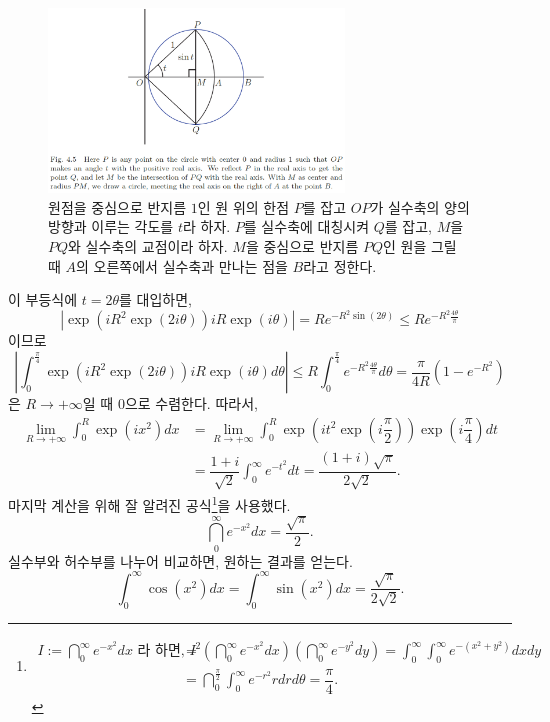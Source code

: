 \begin{salt_example} [프레넬 적분]
\begin{figure}[h!]
\begin{center}
\includegraphics[width=0.7\textwidth]{./SaltChapter/fig-4-5}
\end{center}
\caption{원점을 중심으로 반지름 $1$인 원 위의 한점 $P$를 잡고 $OP$가
실수축의 양의 방향과 이루는 각도를 $t$라 하자. $P$를 실수축에 대칭시켜 $Q$를
잡고, $M$을 $PQ$와 실수축의 교점이라 하자. $M$을 중심으로 반지름 $PQ$인 원을 그릴 때
$A$의 오른쪽에서 실수축과 만나는 점을 $B$라고 정한다. }
\label{fig-4-5}
\end{figure}
이 부등식에 $t=2\theta$를 대입하면,
\[
\left| \exp(iR^2\exp(2i\theta))iR\exp(i\theta) \right|
= Re^{-R^2\sin(2\theta)} \le Re^{-R^2\frac{4\theta}\pi}
\]
이므로
\[
\left| \int_0^{\frac\pi4} \exp(iR^2\exp(2i\theta))iR\exp(i\theta) d\theta\right|
\le R \int_0^{\frac\pi4} e^{-R^2\frac{4\theta}\pi}d\theta
= \dfrac\pi{4R}(1-e^{-R^2})
\]
은 $R\to +\infty$일 때 $0$으로 수렴한다.
따라서, 
\begin{align*}
\lim_{R\to+\infty} \int_0^R \exp(ix^2)dx 
&=  \lim_{R\to+\infty}\int_0^R  \exp\left( it^2\exp\left( i\dfrac\pi2 \right)\right)
\exp\left(i\dfrac\pi4\right) dt \\
&= \dfrac{1+i}{\sqrt{2}} \int_0^\infty e^{-t^2}dt 
= \dfrac{(1+i)\sqrt{\pi}}{2\sqrt{2}}.
\end{align*}
마지막 계산을 위해 잘 알려진 공식\footnote{
\begin{align*}
I:=\dint_0^\infty e^{-x^2} dx\text{  라 하면, \ } 
I^2 &= \left(\dint_0^\infty e^{-x^2} dx\right)\left(\dint_0^\infty e^{-y^2} dy\right) 
= \int_0^\infty \int_0^\infty e^{-(x^2+y^2)}dxdy \\
&= \dint_0^{\frac\pi2} \int_0^\infty e^{-r^2}rdrd\theta = \dfrac\pi4.
\end{align*}
}을 사용했다.
\[
\dint_0^\infty e^{-x^2} dx = \dfrac{\sqrt{\pi}}2.
\]
실수부와 허수부를 나누어 비교하면, 원하는 결과를 얻는다.
\[
\int_0^\infty \cos(x^2) dx =  \int_0^\infty \sin(x^2) dx 
= \dfrac{\sqrt{\pi}}{2\sqrt{2}}.
\]
\end{salt_example}

